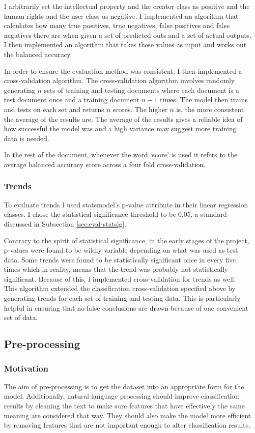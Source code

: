 				I arbitrarily set the intellectual property and the creator class as positive and the human rights and the user class as negative. I implemented an algorithm that calculates how many true positives, true negatives, false positives and false negatives there are when given a set of predicted outs and a set of actual outputs. I then implemented an algorithm that takes these values as input and works out the balanced accuracy.
				
				In order to ensure the evaluation method was consistent, I then implemented a cross-validation algorithm. The cross-validation algorithm involves randomly generating $n$ sets of training and testing documents where each document is a test document once and a training document $n-1$ times. The model then trains and tests on each set and returns $n$ scores. The higher $n$ is, the more consistent the average of the results are. The average of the results gives a reliable idea of how successful the model was and a high variance may suggest more training data is needed.
				
				In the rest of the document, whenever the word `score' is used it refers to the average balanced accuracy score across a four fold cross-validation.
			\subsubsection{Trends}
				To evaluate trends I used statsmodel's p-value attribute in their linear regression classes. I chose the statistical significance threshold to be 0.05, a standard discussed in Subsection \ref{sec:eval-statsig}. 
				
				Contrary to the spirit of statistical significance, in the early stages of the project, p-values were found to be wildly variable depending on what was used as test data. Some trends were found to be statistically significant once in every five times which in reality, means that the trend was probably not statistically significant. Because of this, I implemented cross-validation for trends as well. This algorithm extended the classification cross-validation specified above by generating trends for each set of training and testing data. This is particularly helpful in ensuring that no false conclusions are drawn because of one convenient set of data.
		\subsection{Pre-processing}
			\subsubsection{Motivation}
				The aim of pre-processing is to get the dataset into an appropriate form for the model. Additionally, natural language processing should improve classification results by cleaning the text to make sure features that have effectively the same meaning are considered that way. They should also make the model more efficient by removing features that are not important enough to alter classification results.
